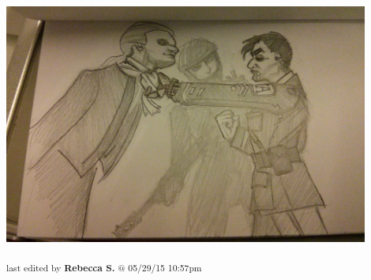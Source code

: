 \begin{center}
\includegraphics[width=12cm]{img/ch27_diplomatic.jpg}
\end{center}

\vspace{\fill}

\begin{flushright}
\textsubscript{last edited by \textbf{Rebecca S.} @ 05/29/15 10:57pm}
\end{flushright}

